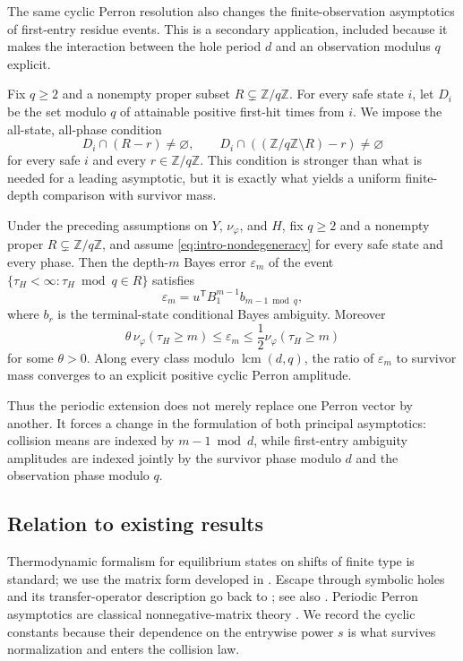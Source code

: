The same cyclic Perron resolution also changes the finite-observation
asymptotics of first-entry residue events.  This is a secondary
application, included because it makes the interaction between the hole
period \(d\) and an observation modulus \(q\) explicit.

Fix \(q\geq2\) and a nonempty proper subset
\(R\subsetneq\mathbb Z/q\mathbb Z\).  For every safe state \(i\), let
\(D_i\) be the set modulo \(q\) of attainable positive first-hit times
from \(i\).  We impose the all-state, all-phase condition
\[
  D_i\cap(R-r)\neq\varnothing,
  \qquad
  D_i\cap((\mathbb Z/q\mathbb Z\setminus R)-r)\neq\varnothing
  \tag{1.1}\label{eq:intro-nondegeneracy}
\]
for every safe \(i\) and every \(r\in\mathbb Z/q\mathbb Z\).  This
condition is stronger than what is needed for a leading asymptotic, but
it is exactly what yields a uniform finite-depth comparison with
survivor mass.

\begin{theorem}
\label{thm:intro-bayes}
Under the preceding assumptions on \(Y\), \(\nu_\varphi\), and \(H\),
fix \(q\geq2\) and a nonempty proper
\(R\subsetneq\mathbb Z/q\mathbb Z\), and assume
\eqref{eq:intro-nondegeneracy} for every safe state and every phase.
Then the depth-\(m\) Bayes error \(\varepsilon_m\) of the event
\(\{\tau_H<\infty:\tau_H\bmod q\in R\}\) satisfies
\[
  \varepsilon_m
  =u^{\mathsf T}B_1^{m-1}b_{m-1\bmod q},
\]
where \(b_r\) is the terminal-state conditional Bayes ambiguity.
Moreover
\[
  \theta\,\nu_\varphi(\tau_H\geq m)
  \leq\varepsilon_m
  \leq\frac12\nu_\varphi(\tau_H\geq m)
\]
for some \(\theta>0\).  Along every class modulo
\(\operatorname{lcm}(d,q)\), the ratio of \(\varepsilon_m\) to survivor
mass converges to an explicit positive cyclic Perron amplitude.
\end{theorem}

Thus the periodic extension does not merely replace one Perron vector by
another.  It forces a change in the formulation of both principal
asymptotics: collision means are indexed by \(m-1\bmod d\), while
first-entry ambiguity amplitudes are indexed jointly by the survivor
phase modulo \(d\) and the observation phase modulo \(q\).

\subsection*{Relation to existing results}

Thermodynamic formalism for equilibrium states on shifts of finite type
is standard; we use the matrix form developed in
\citet{Ruelle1978,Bowen2008,Walters1975GMeasures}.  Escape through
symbolic holes and its transfer-operator description go back to
\citet{PianigianiYorke1979}; see also
\citet{ColletMartinezSchmitt1997,DemersYoung2006,KellerLiverani2009,
FergusonPollicott2012}.  Periodic Perron asymptotics are classical
nonnegative-matrix theory \citep{Seneta2006}.  We record the cyclic
constants because their dependence on the entrywise power \(s\) is what
survives normalization and enters the collision law.

